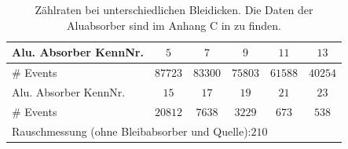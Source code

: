 \begin{table}[h]
    \centering 
    \begin{tabular}{|l|c|c|c|c|c|}
        \hline 
        Alu. Absorber KennNr. & $5$ & $7$ & $9$ & $11$ & $13$  \\
        \hline
        \# Events & $87723$ & $83300$ & $75803$ & $61588$ & $40254$\\ 
        \hline \hline
        Alu. Absorber KennNr. & $15$ & $17$ & $19$ & $21$ & $23$ \\
        \hline
        \# Events & $20812$ & $7638$ & $3229$ & $673$ & $538$\\ 
        \hline \hline
        \multicolumn{6}{|l|}{Rauschmessung (ohne Bleibabsorber und Quelle):\quad $210$}\\
        \hline
    \end{tabular}
    \caption{Zählraten bei unterschiedlichen Bleidicken. Die Daten der Aluabsorber sind im Anhang C in \cite{Versuchsanleitung} zu finden.}
\end{table}


 


